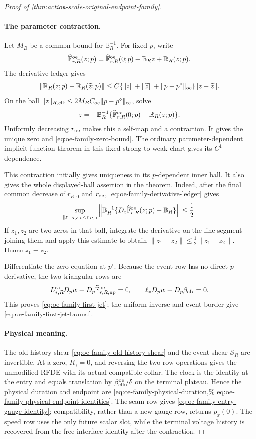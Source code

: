 \begin{proof}[Proof of
\cref{thm:action-scale-original-endpoint-family}]
\paragraph{The parameter contraction.}
Let \(M_B\) be a common bound for \(\mathbb B_R^{-1}\).
For fixed \(p\), write
\[
 \widehat{\mathbb F}_{r,R}^{\rm oe}(z;p)
 =\widehat{\mathbb F}_{r,R}^{\rm oe}(0;p)
    +\mathbb B_Rz+\mathbb R_R(z;p).
\]
The derivative ledger gives
\[
 \|\mathbb R_R(z;p)-\mathbb R_R(\widetilde z;p)\|
 \le C\{\|z\|+\|\widetilde z\|
          +\|p-p^\circ\|_{\rm oe}\}\|z-\widetilde z\|.
\]
On the ball
\(\|z\|_{R,\rm clk}\le
2M_BC_{\rm oe}\|p-p^\circ\|_{\rm oe}\), solve
\begin{equation}
 z=-\mathbb B_R^{-1}
 \{\widehat{\mathbb F}_{r,R}^{\rm oe}(0;p)
       +\mathbb R_R(z;p)\}.                    \label{eq:proof-oe-family-contraction}
\end{equation}
Uniformly decreasing \(r_{\rm oe}\) makes this a self-map and a
contraction.  It gives the unique zero and
\cref{eq:oe-family-zero-bound}.  The ordinary parameter-dependent
implicit-function theorem in this fixed strong-to-weak chart gives its
\(C^1\) dependence.

This contraction initially gives uniqueness in its \(p\)-dependent inner
ball.  It also gives the whole displayed-ball assertion in the theorem.
Indeed, after the final common decrease of \(r_{R,0}\) and \(r_{\rm oe}\),
\cref{eq:oe-family-derivative-ledger} gives
\[
 \sup_{\|z\|_{R,\rm clk}<r_{R,0}}
 \left\|\mathbb B_R^{-1}
   \{D_z\widehat{\mathbb F}_{r,R}^{\rm oe}(z;p)-\mathbb B_R\}
 \right\|\le\frac12.
\]
If \(z_1,z_2\) are two zeros in that ball, integrate the derivative on the
line segment joining them and apply this estimate to obtain
\(\|z_1-z_2\|\le\frac12\|z_1-z_2\|\).  Hence \(z_1=z_2\).

Differentiate the zero equation at \(p^\circ\).  Because the event row has
no direct \(p\)-derivative, the two triangular rows are
\[
 L_{*,R}^{\rm ea}D_pw
   +D_p\widehat{\mathbb F}_{r,R,{\rm up}}^{\rm oe}=0,
 \qquad
 \ell_*D_pw+D_p\beta_{\rm clk}=0.
\]
This proves \cref{eq:oe-family-first-jet}; the uniform inverse and event
border give \cref{eq:oe-family-first-jet-bound}.

\paragraph{Physical meaning.}
The old-history shear
\cref{eq:oe-family-old-history-shear} and the event shear
\(\mathscr S_R\) are invertible.  At a zero,
\(R_\gamma=0\), and reversing the two row operations gives the unmodified
RFDE with its actual compatible collar.  The clock is the identity at the
entry and equals translation by
\(\beta_{\rm clk}^{\rm oe}/\delta\) on the terminal plateau.  Hence the
physical duration and endpoint are
\cref{eq:oe-family-physical-duration,%
eq:oe-family-physical-endpoint-identities}.  The seam row gives
\cref{eq:oe-family-entry-gauge-identity}; compatibility, rather than a new
gauge row, returns \(p_x(0)\).  The speed row uses the only future scalar
slot, while the terminal voltage history is recovered from the
free-interface identity after the contraction.


\end{proof}
